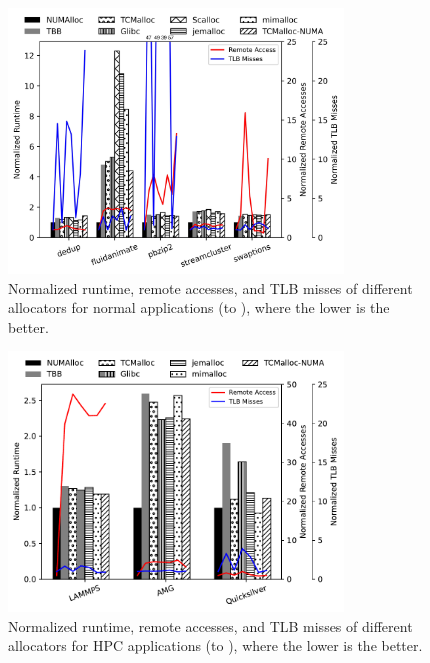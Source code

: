 \begin{figure}[!h]
    \centering 
    \includegraphics[width=3.5in]{figure/remote-access.jpg}
    \caption{Normalized runtime, remote accesses, and TLB misses of different allocators for normal applications (to \NM{}), where the lower is the better. }
    \label{fig:remoteAccess}
\end{figure}

\begin{figure}[!h]
    \centering 
    \includegraphics[width=3.5in]{figure/remote-access-hpc.pdf}
    \caption{Normalized runtime, remote accesses, and TLB misses of different allocators for HPC applications (to \NM{}), where the lower is the better. }
    \label{fig:remoteAccess2}
\end{figure}

